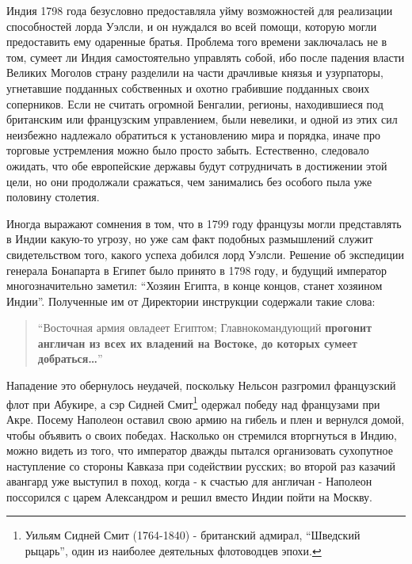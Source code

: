 \documentclass[
  oneside,
  12pt,
  titlepage]{book}
\begin{document}
Индия 1798 года безусловно предоставляла уйму возможностей для реализации способностей лорда Уэлсли, и он нуждался во всей помощи, которую могли предоставить ему одаренные братья. Проблема того времени заключалась не в том, сумеет ли Индия самостоятельно управлять собой, ибо после падения власти Великих Моголов страну разделили на части драчливые князья и узурпаторы, угнетавшие подданных собственных и охотно грабившие подданных своих соперников. Если не считать огромной Бенгалии, регионы, находившиеся под британским или французским управлением, были невелики, и одной из этих сил неизбежно надлежало обратиться к установлению мира и порядка, иначе про торговые устремления можно было просто забыть. Естественно, следовало ожидать, что обе европейские державы будут сотрудничать в достижении этой цели, но они продолжали сражаться, чем занимались без особого пыла уже половину столетия.

Иногда выражают сомнения в том, что в 1799 году французы могли представлять в Индии какую-то угрозу, но уже сам факт подобных размышлений служит свидетельством того, какого успеха добился лорд Уэлсли. Решение об экспедиции генерала Бонапарта в Египет было принято в 1798 году, и будущий император многозначительно заметил: ``Хозяин Египта, в конце концов, станет хозяином Индии''. Полученные им от Директории инструкции содержали такие слова:

\begin{quote}
``Восточная армия овладеет Египтом; Главнокомандующий \textbf{прогонит англичан из всех их владений на Востоке, до которых сумеет добраться\ldots{}}''
\end{quote}

Нападение это обернулось неудачей, поскольку Нельсон разгромил французский флот при Абукире, а сэр Сидней Смит\footnote{Уильям Сидней Смит (1764-1840) - британский адмирал, ``Шведский рыцарь'', один из наиболее деятельных флотоводцев эпохи.} одержал победу над французами при Акре. Посему Наполеон оставил свою армию на гибель и плен и вернулся домой, чтобы объявить о своих победах. Насколько он стремился вторгнуться в Индию, можно видеть из того, что император дважды пытался организовать сухопутное наступление со стороны Кавказа при содействии русских; во второй раз казачий авангард уже выступил в поход, когда - к счастью для англичан - Наполеон поссорился с царем Александром и решил вместо Индии пойти на Москву.
\end{document}
